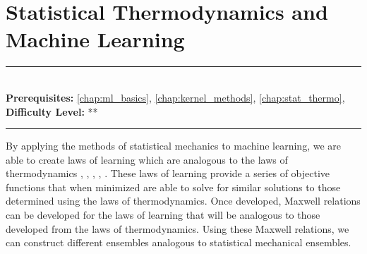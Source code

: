 \documentclass[book.tex]{subfiles}
\begin{document}
\chapter{Statistical Thermodynamics and Machine Learning}

\label{chap:stat_thermo_ml}
\noindent\rule{11cm}{0.4pt} \\
\textbf{Prerequisites:}  \autoref{chap:ml_basics},
\autoref{chap:kernel_methods},
\autoref{chap:stat_thermo},  \\
\textbf{Difficulty Level:} ** \\
\noindent\rule{11cm}{0.4pt}
\vspace{5mm}

By applying the methods of statistical mechanics to machine learning, we are able to create laws of learning which are analogous to the laws of thermodynamics \cite{alemi2016deep}, \cite{alemi2018fixing}, \cite{alemi2018therml}, \cite{alemi2018uncertainty}, \cite{fischer2020ceb}. These laws of learning provide a series of objective functions that when minimized are able to solve for similar solutions to those determined using the laws of thermodynamics. Once developed, Maxwell relations can be developed for the laws of learning that will be analogous to those developed from the laws of thermodynamics. Using these Maxwell relations, we can construct different ensembles analogous to statistical mechanical ensembles.
\end{document}
